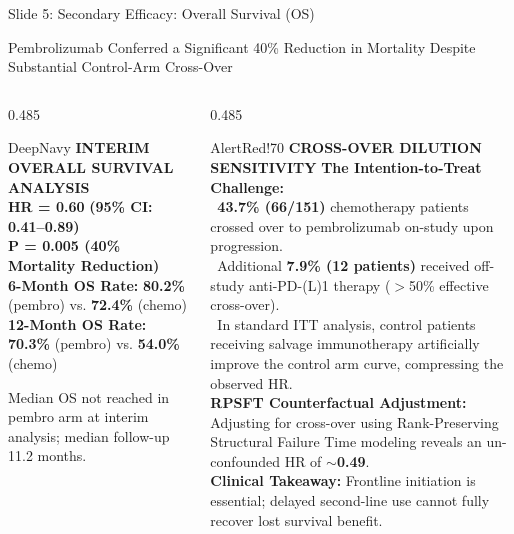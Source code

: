 \documentclass[aspectratio=169,10pt]{beamer}
\begin{document}
\begin{frame}{Slide 5: Secondary Efficacy: Overall Survival (OS)}
\begin{actionbanner}
Pembrolizumab Conferred a Significant 40\% Reduction in Mortality Despite Substantial Control-Arm Cross-Over
\end{actionbanner}

\vspace{2pt}

\begin{columns}[T]
  \begin{column}{0.485\textwidth}
    \begin{statcard}{DeepNavy}
      \centering
      {\scriptsize\textbf{\color{DeepNavy}INTERIM OVERALL SURVIVAL ANALYSIS}}\\[4pt]
      {\large\textbf{\color{DeepNavy}HR = 0.60} \quad \normalsize\textbf{(95\% CI: 0.41--0.89)}}\\[2pt]
      {\small\textbf{\color{SuccessGreen}P = 0.005 (40\% Mortality Reduction)}}\\[5pt]
      {\scriptsize\textbf{6-Month OS Rate:} \textbf{80.2\%} (pembro) vs. \textbf{72.4\%} (chemo)}\\[2pt]
      {\scriptsize\textbf{12-Month OS Rate:} \textbf{70.3\%} (pembro) vs. \textbf{54.0\%} (chemo)}
    \end{statcard}
    \vskip 3pt
    {\tiny\color{TextMuted}Median OS not reached in pembro arm at interim analysis; median follow-up 11.2 months.\par}
  \end{column}

  \begin{column}{0.485\textwidth}
    \begin{statcard}{AlertRed!70}
      {\scriptsize\textbf{\color{AlertRed}CROSS-OVER DILUTION SENSITIVITY}}
      \vskip 3pt
      \tiny
      \textbf{The Intention-to-Treat Challenge:}\\
      \textbullet\ \textbf{43.7\% (66/151)} chemotherapy patients crossed over to pembrolizumab on-study upon progression.\\
      \textbullet\ Additional \textbf{7.9\% (12 patients)} received off-study anti-PD-(L)1 therapy ($>$50\% effective cross-over).\\
      \textbullet\ In standard ITT analysis, control patients receiving salvage immunotherapy artificially improve the control arm curve, compressing the observed HR.\\[3pt]
      \textbf{RPSFT Counterfactual Adjustment:}\\
      Adjusting for cross-over using Rank-Preserving Structural Failure Time modeling reveals an un-confounded HR of \textbf{$\sim$0.49}.\\[2pt]
      \textbf{Clinical Takeaway:} Frontline initiation is essential; delayed second-line use cannot fully recover lost survival benefit.
    \end{statcard}
  \end{column}
\end{columns}
\end{frame}
\end{document}
